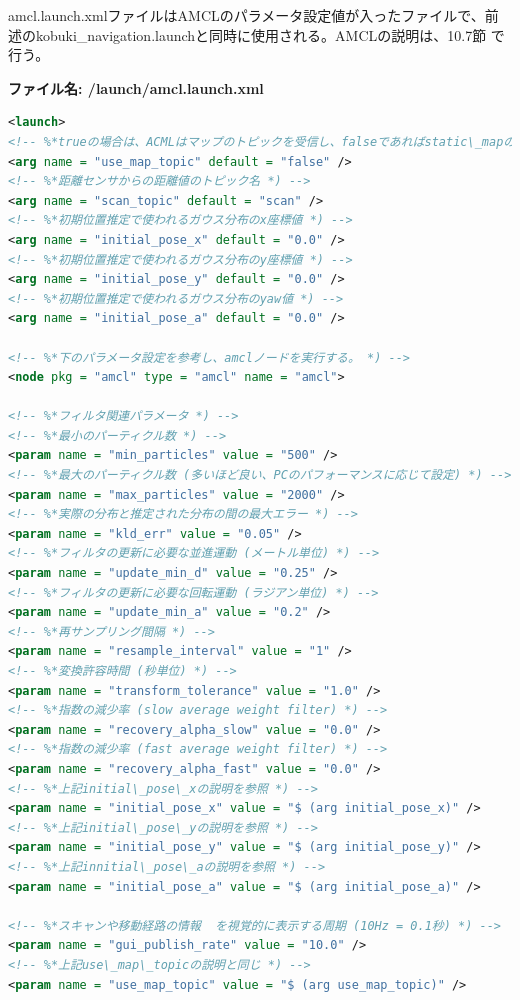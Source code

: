 amcl.launch.xmlファイルはAMCLのパラメータ設定値が入ったファイルで、前述のkobuki\_navigation.launchと同時に使用される。AMCLの説明は、10.7節  で行う。

\textbf{ファイル名: /launch/amcl.launch.xml}
\begin{lstlisting}[language=XML]
<launch>
<!-- %*trueの場合は、ACMLはマップのトピックを受信し、falseであればstatic\_mapのサービスコールを使用する。 *) -->
<arg name = "use_map_topic" default = "false" />
<!-- %*距離センサからの距離値のトピック名 *) -->
<arg name = "scan_topic" default = "scan" />
<!-- %*初期位置推定で使われるガウス分布のx座標値 *) -->
<arg name = "initial_pose_x" default = "0.0" />
<!-- %*初期位置推定で使われるガウス分布のy座標値 *) -->
<arg name = "initial_pose_y" default = "0.0" />
<!-- %*初期位置推定で使われるガウス分布のyaw値 *) -->
<arg name = "initial_pose_a" default = "0.0" />

<!-- %*下のパラメータ設定を参考し、amclノードを実行する。 *) -->
<node pkg = "amcl" type = "amcl" name = "amcl">

<!-- %*フィルタ関連パラメータ *) -->
<!-- %*最小のパーティクル数 *) -->
<param name = "min_particles" value = "500" />
<!-- %*最大のパーティクル数 (多いほど良い、PCのパフォーマンスに応じて設定) *) -->
<param name = "max_particles" value = "2000" />
<!-- %*実際の分布と推定された分布の間の最大エラー *) -->
<param name = "kld_err" value = "0.05" />
<!-- %*フィルタの更新に必要な並進運動 (メートル単位) *) -->
<param name = "update_min_d" value = "0.25" />
<!-- %*フィルタの更新に必要な回転運動 (ラジアン単位) *) -->
<param name = "update_min_a" value = "0.2" />
<!-- %*再サンプリング間隔 *) -->
<param name = "resample_interval" value = "1" />
<!-- %*変換許容時間 (秒単位) *) -->
<param name = "transform_tolerance" value = "1.0" />
<!-- %*指数の減少率 (slow average weight filter) *) -->
<param name = "recovery_alpha_slow" value = "0.0" />
<!-- %*指数の減少率 (fast average weight filter) *) -->
<param name = "recovery_alpha_fast" value = "0.0" />
<!-- %*上記initial\_pose\_xの説明を参照 *) -->
<param name = "initial_pose_x" value = "$ (arg initial_pose_x)" />
<!-- %*上記initial\_pose\_yの説明を参照 *) -->
<param name = "initial_pose_y" value = "$ (arg initial_pose_y)" />
<!-- %*上記innitial\_pose\_aの説明を参照 *) -->
<param name = "initial_pose_a" value = "$ (arg initial_pose_a)" />

<!-- %*スキャンや移動経路の情報  を視覚的に表示する周期 (10Hz = 0.1秒) *) -->
<param name = "gui_publish_rate" value = "10.0" />
<!-- %*上記use\_map\_topicの説明と同じ *) -->
<param name = "use_map_topic" value = "$ (arg use_map_topic)" />


\end{lstlisting}
